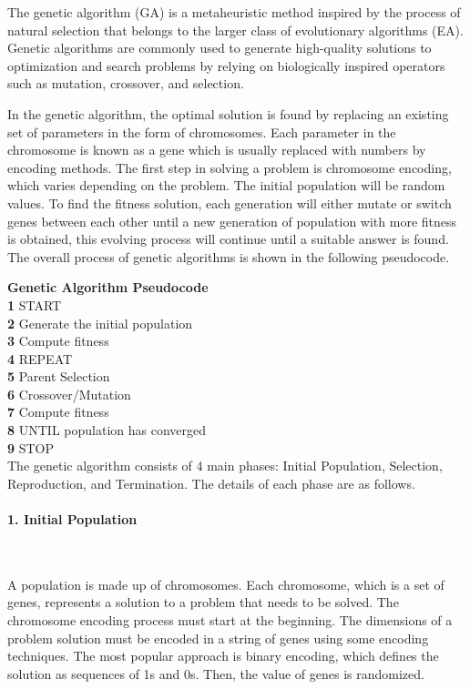 \documentclass[12pt,oneside,openright,a4paper]{cpe-english-project}
\begin{document}
The genetic algorithm (GA) is a metaheuristic method inspired by the process of natural selection that belongs to the larger class of evolutionary algorithms (EA). Genetic algorithms are commonly used to generate high-quality solutions to optimization and search problems by relying on biologically inspired operators such as mutation, crossover, and selection. \cite{Geneticalgorithm}

In the genetic algorithm, the optimal solution is found by replacing an existing set of parameters in the form of chromosomes. Each parameter in the chromosome is known as a gene which is usually replaced with numbers by encoding methods.  The first step in solving a problem is chromosome encoding, which varies depending on the problem. The initial population will be random values. To find the fitness solution, each generation will either mutate or switch genes between each other until a new generation of population with more fitness is obtained, this evolving process will continue until a suitable answer is found. The overall process of genetic algorithms is shown in the following pseudocode.


\textbf{Genetic Algorithm Pseudocode}\cite{IntroductiontoGeneticAlgorithmsIncludingExampleCode}\\
\textbf{1} START\\
\textbf{2} Generate the initial population\\
\textbf{3} Compute fitness\\
\textbf{4} REPEAT\\
\textbf{5} \quad Parent Selection\\
\textbf{6} \quad Crossover/Mutation\\
\textbf{7} \quad Compute fitness\\
\textbf{8} UNTIL population has converged\\
\textbf{9} STOP\\

The genetic algorithm consists of 4 main phases: Initial Population, Selection, Reproduction, and Termination. The details of each phase are as follows.


\paragraph*{1. Initial Population}\

A population is made up of chromosomes. Each chromosome, which is a set of genes, represents a solution to a problem that needs to be solved. The chromosome encoding process must start at the beginning. The dimensions of a problem solution must be encoded in a string of genes using some encoding techniques. The most popular approach is binary encoding, which defines the solution as sequences of 1s and 0s. Then, the value of genes is randomized.
\end{document}
